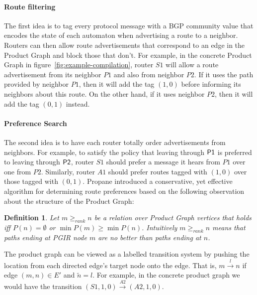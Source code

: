 \documentclass[numbers, 10pt, preprint]{sigplanconf}
\newcommand{\para}[1]{\paragraph*{\textbf{#1}}}
\newtheorem{defn}{Definition}
\begin{document}
\para{Route filtering}

The first idea is to tag every protocol message with a BGP community value that encodes the state of each automaton when advertising a route to a neighbor. Routers can then allow route advertisements that correspond to an edge in the Product Graph and block those that don't.
For example, in the concrete Product Graph in figure~\ref{fig:example-compilation}, router $S1$ will allow a route advertisement from its neighbor $P1$ and also from neighbor $P2$. If it uses the path provided by neighbor $P1$, then it will add the tag $(1,0)$ before informing its neighbors about this route. On the other hand, if it uses neighbor $P2$, then it will add the tag $(0,1)$ instead.


\para{Preference Search}
The second idea is to have each router totally order advertisements from neighbors. For example, to satisfy the policy that leaving through $\sf{P1}$ is preferred to leaving through $\sf{P2}$, router $S1$ should prefer a message it hears from $P1$ over one from $P2$. Similarly, router $A1$ should prefer routes tagged with $(1,0)$ over those tagged with $(0,1)$.
Propane introduced a conservative, yet effective algorithm for determining route preferences based on the following observation about the structure of the Product Graph:

\begin{defn}
Let $m \geq_{rank} n$ be a relation over Product Graph vertices that holds iff $P(n) = \emptyset$ or $\min P(m) \geq \min P(n)$. Intuitively $m \geq_{rank} n$ means that paths ending at PGIR node $m$ are no better than paths ending at $n$.
%
\end{defn}
\noindent
%

The product graph can be viewed as a labelled transition system by pushing the location from each directed edge's target node onto the edge. That is, $m\overset{l}{\rightarrow}n$ if edge $(m,n) \in E'$ and $\tilde{n} = l$.
%
For example, in the concrete product graph we would have the transition $(S1,1,0)\overset{A2}{\rightarrow}(A2,1,0)$.
\end{document}
